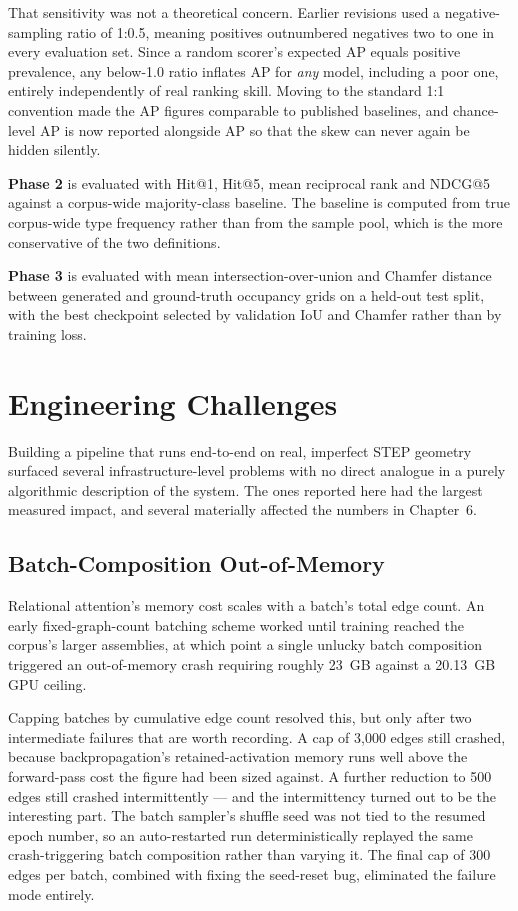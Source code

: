 \documentclass[12pt,oneside,a4paper]{report}
\begin{document}
That sensitivity was not a theoretical concern. Earlier revisions used a
negative-sampling ratio of 1:0.5, meaning positives outnumbered negatives two
to one in every evaluation set. Since a random scorer's expected AP equals
positive prevalence, any below-1.0 ratio inflates AP for \emph{any} model,
including a poor one, entirely independently of real ranking skill. Moving to
the standard 1:1 convention made the AP figures comparable to published
baselines, and chance-level AP is now reported alongside AP so that the skew
can never again be hidden silently.

\textbf{Phase 2} is evaluated with Hit@1, Hit@5, mean reciprocal rank and
NDCG@5 against a corpus-wide majority-class baseline. The baseline is
computed from true corpus-wide type frequency rather than from the sample
pool, which is the more conservative of the two definitions.

\textbf{Phase 3} is evaluated with mean intersection-over-union and Chamfer
distance between generated and ground-truth occupancy grids on a held-out
test split, with the best checkpoint selected by validation IoU and Chamfer
rather than by training loss.

\section{Engineering Challenges}
\label{sec:challenges}

Building a pipeline that runs end-to-end on real, imperfect STEP geometry
surfaced several infrastructure-level problems with no direct analogue in a
purely algorithmic description of the system. The ones reported here had the
largest measured impact, and several materially affected the numbers in
Chapter~6.

\subsection{Batch-Composition Out-of-Memory}

Relational attention's memory cost scales with a batch's total edge count. An
early fixed-graph-count batching scheme worked until training reached the
corpus's larger assemblies, at which point a single unlucky batch composition
triggered an out-of-memory crash requiring roughly 23~GB against a 20.13~GB
GPU ceiling.

Capping batches by cumulative edge count resolved this, but only after two
intermediate failures that are worth recording. A cap of 3,000 edges still
crashed, because backpropagation's retained-activation memory runs well above
the forward-pass cost the figure had been sized against. A further reduction
to 500 edges still crashed intermittently --- and the intermittency turned
out to be the interesting part. The batch sampler's shuffle seed was not tied
to the resumed epoch number, so an auto-restarted run deterministically
replayed the same crash-triggering batch composition rather than varying it.
The final cap of 300 edges per batch, combined with fixing the seed-reset
bug, eliminated the failure mode entirely.
\end{document}
